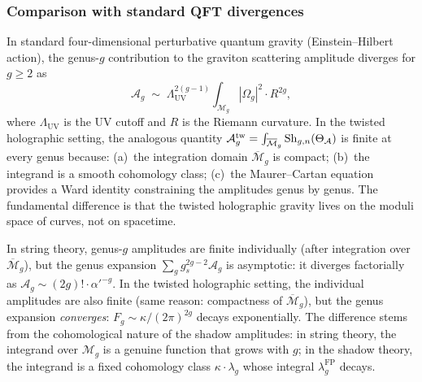 \subsubsection{Comparison with standard QFT divergences}

\begin{remark}[Contrast with perturbative quantum gravity in $d = 4$]
In standard four-dimensional perturbative quantum gravity (Einstein--Hilbert action), the genus-$g$ contribution to the graviton scattering amplitude diverges for $g \geq 2$ as
\begin{equation}%
\mathcal{A}_g \;\sim\; \Lambda_{\mathrm{UV}}^{2(g-1)} \int_{\mathcal{M}_g} |\Omega_g|^2 \cdot R^{2g},
\end{equation}
where $\Lambda_{\mathrm{UV}}$ is the UV cutoff and $R$ is the Riemann curvature. In the twisted holographic setting, the analogous quantity $\mathcal{A}_g^{\mathrm{tw}} = \int_{\overline{\mathcal{M}}_g} \operatorname{Sh}_{g,n}(\Theta_{\mathcal{A}})$ is finite at every genus because: (a)~the integration domain $\overline{\mathcal{M}}_g$ is compact; (b)~the integrand is a smooth cohomology class; (c)~the Maurer--Cartan equation provides a Ward identity constraining the amplitudes genus by genus. The fundamental difference is that the twisted holographic gravity lives on the moduli space of curves, not on spacetime.
\end{remark}

\begin{remark}
In string theory, genus-$g$ amplitudes are finite individually (after integration over $\overline{\mathcal{M}}_g$), but the genus expansion $\sum_g g_s^{2g-2} \mathcal{A}_g$ is asymptotic: it diverges factorially as $\mathcal{A}_g \sim (2g)! \cdot \alpha'^{-g}$. In the twisted holographic setting, the individual amplitudes are also finite (same reason: compactness of $\overline{\mathcal{M}}_g$), but the genus expansion \emph{converges}: $F_g \sim \kappa/(2\pi)^{2g}$ decays exponentially. The difference stems from the cohomological nature of the shadow amplitudes: in string theory, the integrand over $\mathcal{M}_g$ is a genuine function that grows with $g$; in the shadow theory, the integrand is a fixed cohomology class $\kappa \cdot \lambda_g$ whose integral $\lambda_g^{\mathrm{FP}}$ decays.
\end{remark}

